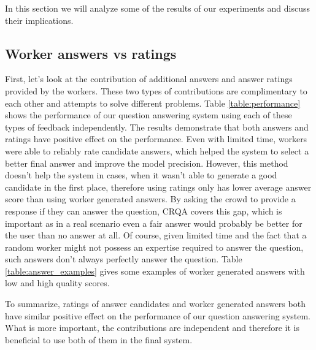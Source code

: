 In this section we will analyze some of the results of our experiments and discuss their implications.

\subsection{Worker answers vs ratings}
\label{sec:analysis:answers_vs_ratings}

First, let's look at the contribution of additional answers and answer ratings provided by the workers.
These two types of contributions are complimentary to each other and attempts to solve different problems.
Table \ref{table:performance} shows the performance of our question answering system using each of these types of feedback independently.
The results demonstrate that both answers and ratings have positive effect on the performance.
Even with limited time, workers were able to reliably rate candidate answers, which helped the system to select a better final answer and improve the model precision.
However, this method doesn't help the system in cases, when it wasn't able to generate a good candidate in the first place, therefore using ratings only has lower average answer score than using worker generated answers.
By asking the crowd to provide a response if they can answer the question, CRQA covers this gap, which is important as in a real scenario even a fair answer would probably be better for the user than no answer at all.
Of course, given limited time and the fact that a random worker might not possess an expertise required to answer the question, such answers don't always perfectly answer the question.
Table \ref{table:answer_examples} gives some examples of worker generated answers with low and high quality scores.

To summarize, ratings of answer candidates and worker generated answers both have similar positive effect on the performance of our question answering system.
What is more important, the contributions are independent and therefore it is beneficial to use both of them in the final system.


